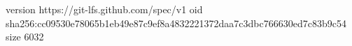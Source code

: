 version https://git-lfs.github.com/spec/v1
oid sha256:cc09530e78065b1eb49e87c9ef8a4832221372daa7c3dbc766630ed7c83b9c54
size 6032
